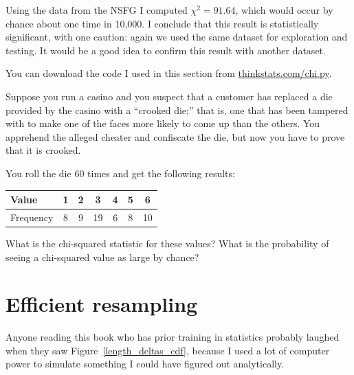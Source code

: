 \documentclass[12pt]{book}
\begin{document}

Using the data from the NSFG I computed $\chi^2 = 91.64$, which would
occur by chance about one time in 10,000.  I conclude that this result
is statistically significant, with one caution: again we used the
same dataset for exploration and testing.  It would be a good idea
to confirm this result with another dataset.


You can download the code I used in this section from
\url{thinkstats.com/chi.py}.




\begin{ex}


Suppose you run a casino and you suspect that a customer has
replaced a die provided by the casino with a ``crooked die;'' that
is, one that has been tampered with to make one of the faces more
likely to come up than the others.  You apprehend the alleged
cheater and confiscate the die, but now you have to prove that it
is crooked.

You roll the die 60 times and get the following results:

\begin{center}
\begin{tabular}{|l|c|c|c|c|c|c|}
\hline
Value     &  1  &  2  &  3  &  4  &  5  &  6  \\ 
\hline
\hline
Frequency &  8  &  9  &  19  &  6  &  8  &  10  \\
\hline
\end{tabular}
\end{center}

What is the chi-squared statistic for these values?  What is the
probability of seeing a chi-squared value as large by chance?

\end{ex}




\section{Efficient resampling}

Anyone reading this book who has prior training in statistics probably
laughed when they saw Figure~\ref{length_deltas_cdf}, because I used a
lot of computer power to simulate something I could have figured out
analytically.
\end{document}
